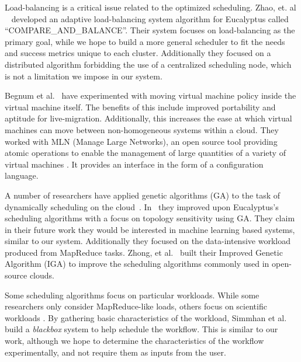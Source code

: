 Load-balancing is a critical issue related to the optimized scheduling.  Zhao,
et. al ~\cite{Zhao} developed an adaptive load-balancing system algorithm for
Eucalyptus called ``COMPARE\_AND\_BALANCE''.  Their system focuses on
load-balancing as the primary goal, while we hope to build a more general
scheduler to fit the needs and success metrics unique to each cluster.
Additionally they focused on a distributed algorithm forbidding the use of a
centralized scheduling node, which is not a limitation we impose in our system.


Begnum et al.~\cite{Begnum} have experimented with moving virtual machine policy
inside the virtual machine itself.  The benefits of this include improved
portability and aptitude for live-migration.  Additionally, this increases the
ease at which virtual machines can move between non-homogeneous systems within a
cloud.  They worked with MLN (Manage Large Networks), an open source tool
providing atomic operations to enable the management of large quantities of a
variety of virtual machines \cite{Xen,UML,VMware}.  It provides an interface in
the form of a configuration language.


A number of researchers have applied genetic algorithms (GA) to the task of
dynamically scheduling on the cloud~\cite{Lee,Zhong,Chenhong}.  In~\cite{Lee}
they improved upon Eucalyptus's scheduling algorithms with a focus on topology
sensitivity using GA.  They claim in their future work they would be interested
in machine learning based systems, similar to our system.  Additionally they
focused on the data-intensive workload produced from MapReduce tasks. Zhong, et
al.~\cite{Zhong} built their Improved Genetic Algorithm (IGA) to improve the
scheduling algorithms commonly used in open-source clouds.


Some scheduling algorithms focus on particular workloads.  While some
researchers only consider MapReduce-like loads, others focus on scientific
workloads \cite{Juve,Simmhan,Hoffa}.  By gathering basic characteristics of the
workload, Simmhan et al.~\cite{Simmhan} build a \emph{blackbox} system to help
schedule the workflow.  This is similar to our work, although we hope to
determine the characteristics of the workflow experimentally, and not require
them as inputs from the user.
